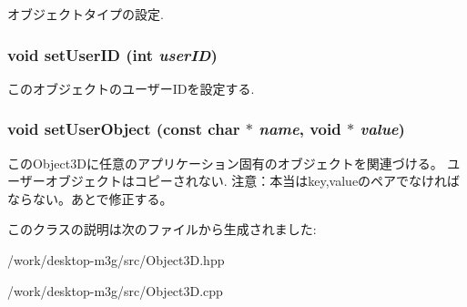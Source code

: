 オブジェクトタイプの設定. \hypertarget{classm3g_1_1Object3D_5e4753e91dca5aa56abacb7fde69f332}{
\subsubsection[{setUserID}]{\setlength{\rightskip}{0pt plus 5cm}void setUserID (int {\em userID})}}
\label{classm3g_1_1Object3D_5e4753e91dca5aa56abacb7fde69f332}


このオブジェクトのユーザーIDを設定する. \hypertarget{classm3g_1_1Object3D_989411d827091f4a5e97e0377bbd1a7a}{
\subsubsection[{setUserObject}]{\setlength{\rightskip}{0pt plus 5cm}void setUserObject (const char $\ast$ {\em name}, \/  void $\ast$ {\em value})}}
\label{classm3g_1_1Object3D_989411d827091f4a5e97e0377bbd1a7a}


このObject3Dに任意のアプリケーション固有のオブジェクトを関連づける。 ユーザーオブジェクトはコピーされない. 注意：本当はkey,valueのペアでなければならない。あとで修正する。 

このクラスの説明は次のファイルから生成されました:\begin{CompactItemize}
\item 
/work/desktop-m3g/src/Object3D.hpp\item 
/work/desktop-m3g/src/Object3D.cpp\end{CompactItemize}
